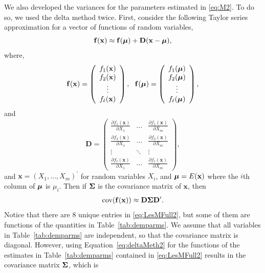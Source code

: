 \documentclass[]{risa}\usepackage[]{graphicx}\usepackage[]{color}
\newcommand{\bx}{\ensuremath{\mathbf{x}}}
\def\bldf{\mathbf{f}}
\def\bx{\mathbf{x}}
\def\bD{\mathbf{D}}
\def\bmu{\mbox{\boldmath $\mu$}}
\def\bSigma{\mbox{\boldmath $\Sigma$}}
\def\cov{\textrm{cov}}
\def\upp{^{\prime}}
\begin{document}
We also developed the variances for the parameters estimated in \ref{eq:M2}.  To do so, we used the delta method \citep{Dorf:anot:1938,Ver:who:2012} twice.  First, consider the following Taylor series approximation for a vector of functions of random variables,
\begin{equation} \label{eq:deltaMeth1}
  \bldf(\bx) \approx \bldf(\bmu) + \bD (\bx - \bmu),
\end{equation}
where,
\[
\bldf(\bx) = \left(\begin{array}{c}
    f_1(\bx) \\
    f_2(\bx) \\
    \vdots \\
    f_\ell(\bx)
  \end{array}\right), \ \
\bldf(\bmu) = \left(\begin{array}{c}
  f_1(\bmu) \\
  f_2(\bmu) \\
  \vdots \\
  f_\ell(\bmu)
\end{array}\right),
\]
and
\[
\bD =  \left(\begin{array}{ccc}
  \frac{\partial f_1(\bx)}{\partial X_1} & \ldots & \frac{\partial f_1(\bx)}{\partial X_m} \\
  \frac{\partial f_2(\bx)}{\partial X_1} & \ldots & \frac{\partial f_2(\bx)}{\partial X_m} \\
  \vdots & \ddots & \vdots \\
  \frac{\partial f_\ell(\bx)}{\partial X_1} & \ldots & \frac{\partial f_\ell(\bx)}{\partial X_m}
\end{array}\right),
\]
and $\bx = (X_1,\ldots,X_m)\upp$ for random variables $X_i$, and $\bmu = E(\bx)$ where the $i$th column of $\bmu$ is $\mu_i$.  Then if $\bSigma$ is the covariance matrix of $\bx$, then
\begin{equation} \label{eq:deltaMeth2}
  \cov(\bldf(\bx)) \approx \bD \bSigma \bD\upp.
\end{equation}
Notice that there are 8 unique entries in \ref{eq:LesMFull2}, but some of them are functions of the quantities in Table~\ref{tab:demparms}. We assume that all variables in Table~\ref{tab:demparms} are independent, so that the covariance matrix is diagonal.  However, using Equation~\ref{eq:deltaMeth2} for the functions of the estimates in Table~\ref{tab:demparms} contained in \ref{eq:LesMFull2} results in the covariance matrix $\bSigma$, which is
\end{document}
